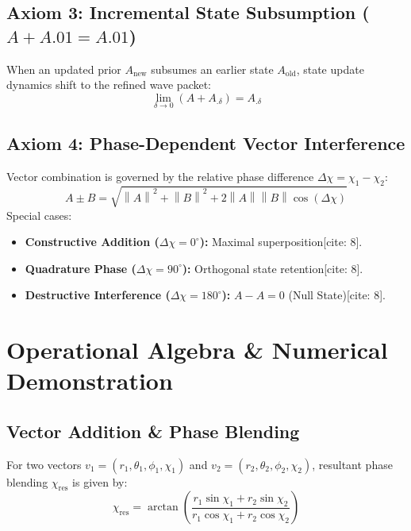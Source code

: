 \documentclass[12pt, a4paper]{article}
\providecommand{\norm}[1]{\left\lVert#1\right\rVert}
\begin{document}
\subsection{Axiom 3: Incremental State Subsumption ($A + A.01 = A.01$)}
When an updated prior $A_{\text{new}}$ subsumes an earlier state $A_{\text{old}}$, state update dynamics shift to the refined wave packet:
\begin{equation}
    \lim_{\delta \to 0} (A + A_{.\delta}) = A_{.\delta}
\end{equation}

\subsection{Axiom 4: Phase-Dependent Vector Interference}
Vector combination is governed by the relative phase difference $\Delta\chi = \chi_1 - \chi_2$:
\begin{equation}
    A \pm B = \sqrt{\norm{A}^2 + \norm{B}^2 + 2\norm{A}\norm{B}\cos(\Delta\chi)}
\end{equation}
Special cases:
\begin{itemize}
    \item \textbf{Constructive Addition ($\Delta\chi = 0^\circ$):} Maximal superposition[cite: 8].
    \item \textbf{Quadrature Phase ($\Delta\chi = 90^\circ$):} Orthogonal state retention[cite: 8].
    \item \textbf{Destructive Interference ($\Delta\chi = 180^\circ$):} $A - A = 0$ (Null State)[cite: 8].
\end{itemize}

\section{Operational Algebra \& Numerical Demonstration}

\subsection{Vector Addition \& Phase Blending}
For two vectors $v_1 = (r_1, \theta_1, \phi_1, \chi_1)$ and $v_2 = (r_2, \theta_2, \phi_2, \chi_2)$, resultant phase blending $\chi_{\text{res}}$ is given by:
\begin{equation}
    \chi_{\text{res}} = \arctan\left(\frac{r_1\sin\chi_1 + r_2\sin\chi_2}{r_1\cos\chi_1 + r_2\cos\chi_2}\right)
\end{equation}
\end{document}
